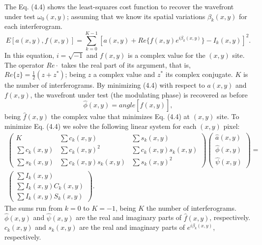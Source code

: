 The Eq. (4.4) shows the least-squares cost function to recover the wavefront
under test $\omega_0(x,y)$; assuming that we know its spatial variations
$\beta_k(x,y)$ for each interferogram.
\begin{equation}
  E[a(x,y),f(x,y)]=\sum_{k=0}^{K-1}[a(x,y) + Re\{f(x,y) e^{i\beta_k (x,y)} \} -
I_k (x,y)]^2.
\end{equation}
In this equation, $i = \sqrt{-1}$ and $f(x,y)$ is a complex value for the
$(x,y)$ site. The operator $Re{\cdot}$ takes the real part of its argument,
that is, $Re\{z\} = \frac{1}{2} (z+z^*)$; being $z$ a complex value and $z^*$
its complex conjugate. $K$ is the number of interferograms. By minimizing (4.4)
with respect to $a(x,y)$ and $f(x,y)$, the wavefront under test (the modulating
phase) is recovered as before 
\begin{equation}
 \hat{\phi}(x,y)=angle[\hat{f}(x,y)],
\end{equation}
being $\hat{f}(x,y)$ the complex value that minimizes Eq. (4.4) at $(x,y)$ site.
To minimize Eq. (4.4) we solve the following linear system for each $(x,y)$
pixel:
\begin{multline}
\left(\begin{array}{ccc}
K & \sum c_{k}(x,y) & \sum s_{k}(x,y)\\
\sum c_{k}(x,y) & \sum c_{k}(x,y)^{2} & \sum c_{k}(x,y)s_{k}(x,y)\\
\sum s_{k}(x,y) & \sum c_{k}(x,y)s_{k}(x,y) & \sum s_{k}(x,y)^{2}
\end{array}\right)\left(\begin{array}{c}
\hat{a}(x,y)\\
\hat{\phi}(x,y)\\
\hat{\psi}(x,y)
\end{array}\right) = \\ \left(\begin{array}{c}
\sum I_{k}(x,y)\\
\sum I_{k}(x,y)C_{k}(x,y)\\
\sum I_{k}(x,y)S_{k}(x,y)
\end{array}\right).
\end{multline}
The sums run from $k = 0$ to $K=-1$, being $K$ the number of interferograms.
$\hat{\phi}(x,y)$ and $\hat{\psi}(x,y)$ are the real and imaginary parts of 
$\hat{f}(x,y)$, respectively. $c_k(x,y)$ and $s_k(x,y)$ are the real and
imaginary parts of $e^{i\beta_k(x,y)}$, respectively.

